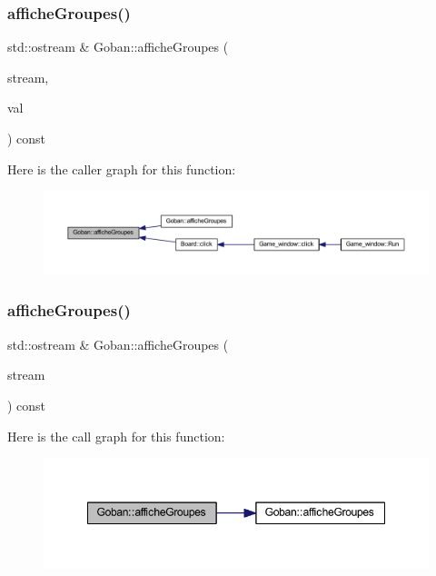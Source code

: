 \subsubsection{\texorpdfstring{affiche\+Groupes()}{afficheGroupes()}\hspace{0.1cm}{\footnotesize\ttfamily [1/2]}}
{\footnotesize\ttfamily std\+::ostream \& Goban\+::affiche\+Groupes (\begin{DoxyParamCaption}\item[{std\+::ostream \&}]{stream,  }\item[{const \hyperlink{class_etat_af3ddb2296ffc379b7f3ad2bf832f294e}{Etat\+::\+V\+AL} \&}]{val }\end{DoxyParamCaption}) const}

Here is the caller graph for this function\+:
\nopagebreak
\begin{figure}[H]
\begin{center}
\leavevmode
\includegraphics[width=350pt]{class_goban_aefd43ab2cf0746f2f8c653d825bf080c_icgraph}
\end{center}
\end{figure}
\mbox{\label{class_goban_a8d5df6cd74b0240f36a4056f045625b7}} 
\subsubsection{\texorpdfstring{affiche\+Groupes()}{afficheGroupes()}\hspace{0.1cm}{\footnotesize\ttfamily [2/2]}}
{\footnotesize\ttfamily std\+::ostream \& Goban\+::affiche\+Groupes (\begin{DoxyParamCaption}\item[{std\+::ostream \&}]{stream }\end{DoxyParamCaption}) const}

Here is the call graph for this function\+:
\nopagebreak
\begin{figure}[H]
\begin{center}
\leavevmode
\includegraphics[width=348pt]{class_goban_a8d5df6cd74b0240f36a4056f045625b7_cgraph}
\end{center}
\end{figure}
\mbox{\label{class_goban_ae7ee3b39f3c0d28c9bca286ca538f8ac}} 
